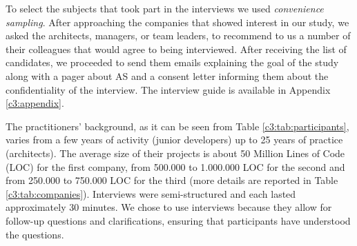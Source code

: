 To select the subjects that took part in the interviews we used \emph{convenience sampling}. After approaching the companies that showed interest in our study, we asked the architects, managers, or team leaders, to recommend to us a number of their colleagues that would agree to being interviewed. After receiving the list of candidates, we proceeded to send them emails explaining the goal of the study along with a pager about AS and a consent letter informing them about the confidentiality of the interview.
The interview guide is available in Appendix \ref{c3:appendix}.

The practitioners' background, as it can be seen from Table \ref{c3:tab:participants}, varies from a few years of activity (junior developers) up to 25 years of practice (architects).
The average size of their projects is about 50 Million Lines of Code (LOC) for the first company, from 500.000 to 1.000.000 LOC for the second and from 250.000 to 750.000 LOC for the third (more details are reported in Table \ref{c3:tab:companies}). 
Interviews were semi-structured and each lasted approximately 30 minutes. We chose to use interviews because they allow for follow-up questions and clarifications, ensuring that participants have understood the questions. 

